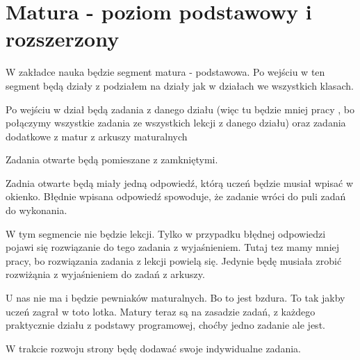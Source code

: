 \documentclass[12pt,a4paper]{report}
\begin{document}
\section{Matura - poziom podstawowy i rozszerzony}
\begin{ElearnReviewComment}[title={Komentarz nr 16 -- Anna Kogut, 2026-07-22}]
W zakładce nauka będzie segment matura - podstawowa. Po wejściu w ten segment będą działy z podziałem na działy jak w działach we wszystkich klasach.

Po wejściu w dział będą zadania z danego działu (więc tu będzie mniej pracy , bo połączymy wszystkie zadania ze wszystkich lekcji z danego działu) oraz zadania dodatkowe z matur z arkuszy maturalnych

Zadania otwarte będą pomieszane z zamkniętymi.

Zadnia otwarte będą miały jedną odpowiedź, którą uczeń będzie musiał wpisać w okienko. Błędnie wpisana odpowiedź spowoduje, że zadanie wróci do puli zadań do wykonania.

W tym segmencie nie będzie lekcji. Tylko w przypadku błędnej odpowiedzi pojawi się rozwiązanie do tego zadania z wyjaśnieniem. Tutaj tez mamy mniej pracy, bo rozwiązania zadania z lekcji powielą się. Jedynie będę musiała zrobić rozwiżąnia z wyjaśnieniem do zadań z arkuszy.

U nas nie ma i będzie pewniaków maturalnych. Bo to jest bzdura. To tak jakby uczeń zagrał w toto lotka. Matury teraz są na zasadzie zadań, z każdego praktycznie działu z podstawy programowej, choćby jedno zadanie ale jest.

W trakcie rozwoju strony będę dodawać swoje indywidualne zadania.
\end{ElearnReviewComment}
\end{document}
